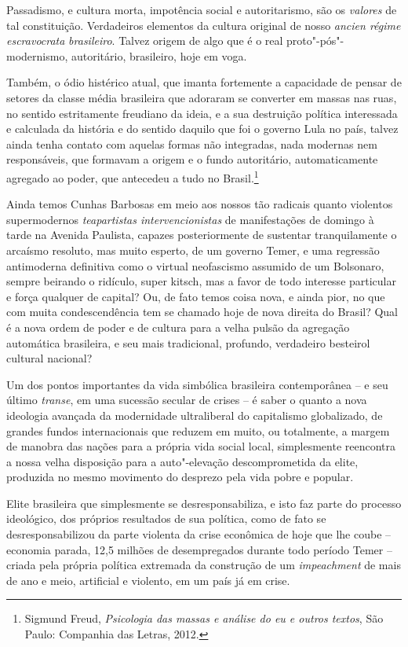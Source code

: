 Passadismo, e cultura morta, impotência social e autoritarismo, são os
\emph{valores} de tal constituição. Verdadeiros elementos da cultura
original de nosso \emph{ancien régime escravocrata} \emph{brasileiro}.
Talvez origem de algo que é o real proto"-pós"-modernismo, autoritário,
brasileiro, hoje em voga.

Também, o ódio histérico atual, que imanta fortemente a capacidade de
pensar de setores da classe média brasileira que adoraram se converter
em massas nas ruas, no sentido estritamente freudiano da ideia, e a sua
destruição política interessada e calculada da história e do sentido
daquilo que foi o governo Lula no país, talvez ainda tenha contato com
aquelas formas não integradas, nada modernas nem responsáveis, que
formavam a origem e o fundo autoritário, automaticamente agregado ao
poder, que antecedeu a tudo no Brasil.\footnote{Sigmund Freud,
  \emph{Psicologia das massas e análise do eu e outros textos}, São
  Paulo: Companhia das Letras, 2012.}

Ainda temos Cunhas Barbosas em meio aos nossos tão radicais quanto
violentos supermodernos \emph{teapartistas intervencionistas} de
manifestações de domingo à tarde na Avenida Paulista, capazes
posteriormente de sustentar tranquilamente o arcaísmo resoluto, mas
muito esperto, de um governo Temer, e uma regressão antimoderna
definitiva como o virtual neofascismo assumido de um Bolsonaro, sempre
beirando o ridículo, super kitsch, mas a favor de todo interesse
particular e força qualquer de capital? Ou, de fato temos coisa nova, e
ainda pior, no que com muita condescendência tem se chamado hoje de nova
direita do Brasil? Qual é a nova ordem de poder e de cultura para a
velha pulsão da agregação automática brasileira, e seu mais tradicional,
profundo, verdadeiro besteirol cultural nacional?

Um dos pontos importantes da vida simbólica brasileira contemporânea --
e seu último \emph{transe}, em uma sucessão secular de crises -- é saber
o quanto a nova ideologia avançada da modernidade ultraliberal do
capitalismo globalizado, de grandes fundos internacionais que reduzem em
muito, ou totalmente, a margem de manobra das nações para a própria vida
social local, simplesmente reencontra a nossa velha disposição para a
auto"-elevação descomprometida da elite, produzida no mesmo movimento do
desprezo pela vida pobre e popular.

Elite brasileira que simplesmente se desresponsabiliza, e isto faz parte
do processo ideológico, dos próprios resultados de sua política, como de
fato se desresponsabilizou da parte violenta da crise econômica de hoje
que lhe coube -- economia parada, 12,5 milhões de desempregados durante
todo período Temer -- criada pela própria política extremada da
construção de um \emph{impeachment} de mais de ano e meio, artificial e
violento, em um país já em crise.

